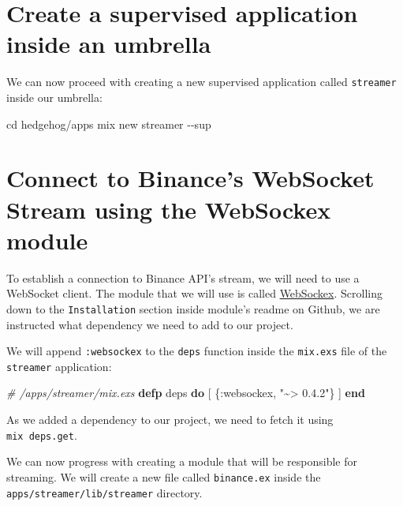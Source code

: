 \documentclass[
]{book}
\newenvironment{Shaded}{\begin{snugshade}}{\end{snugshade}}
\newcommand{\AttributeTok}[1]{\textcolor[rgb]{0.77,0.63,0.00}{#1}}
\newcommand{\BuiltInTok}[1]{#1}
\newcommand{\CommentTok}[1]{\textcolor[rgb]{0.56,0.35,0.01}{\textit{#1}}}
\newcommand{\ExtensionTok}[1]{#1}
\newcommand{\KeywordTok}[1]{\textcolor[rgb]{0.13,0.29,0.53}{\textbf{#1}}}
\newcommand{\NormalTok}[1]{#1}
\newcommand{\StringTok}[1]{\textcolor[rgb]{0.31,0.60,0.02}{#1}}
\newcommand{\VariableTok}[1]{\textcolor[rgb]{0.00,0.00,0.00}{#1}}
\begin{document}
\hypertarget{create-a-supervised-application-inside-an-umbrella}{%
\section{Create a supervised application inside an umbrella}\label{create-a-supervised-application-inside-an-umbrella}}

We can now proceed with creating a new supervised application called \texttt{streamer} inside our umbrella:

\begin{Shaded}
\begin{Highlighting}[]
\BuiltInTok{cd}\NormalTok{ hedgehog/apps}
\ExtensionTok{mix}\NormalTok{ new streamer }\AttributeTok{{-}{-}sup}
\end{Highlighting}
\end{Shaded}

\hypertarget{connect-to-binances-websocket-stream-using-the-websockex-module}{%
\section{Connect to Binance's WebSocket Stream using the WebSockex module}\label{connect-to-binances-websocket-stream-using-the-websockex-module}}

To establish a connection to Binance API's stream, we will need to use a WebSocket client. The module that we will use is called \href{https://github.com/Azolo/websockex}{WebSockex}. Scrolling down to the \texttt{Installation} section inside module's readme on Github, we are instructed what dependency we need to add to our project.

We will append \texttt{:websockex} to the \texttt{deps} function inside the \texttt{mix.exs} file of the \texttt{streamer} application:

\begin{Shaded}
\begin{Highlighting}[]
  \CommentTok{\# /apps/streamer/mix.exs}
  \KeywordTok{defp}\NormalTok{ deps }\KeywordTok{do}
\NormalTok{    [}
\NormalTok{      \{}\VariableTok{:websockex}\NormalTok{, }\StringTok{"\textasciitilde{}\textgreater{} 0.4.2"}\NormalTok{\}}
\NormalTok{    ]}
  \KeywordTok{end}
\end{Highlighting}
\end{Shaded}

As we added a dependency to our project, we need to fetch it using \texttt{mix\ deps.get}.

We can now progress with creating a module that will be responsible for streaming. We will create a new file called \texttt{binance.ex} inside the \texttt{apps/streamer/lib/streamer} directory.
\end{document}
